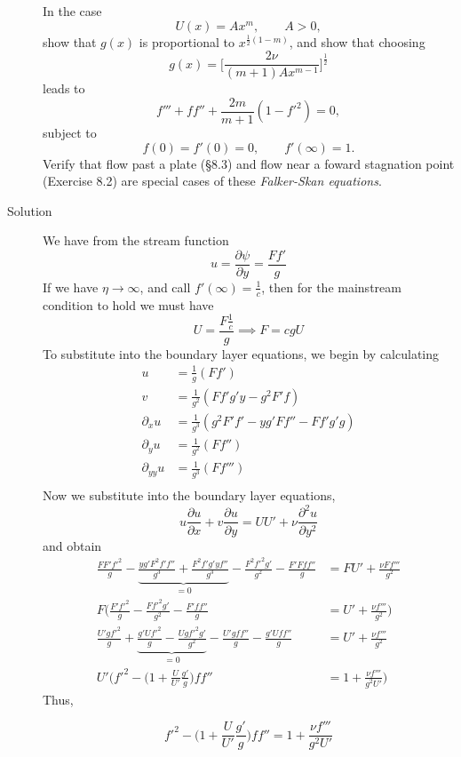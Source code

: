 \documentclass[11pt]{article}
\newcommand{\eq}[1]{\begin{align*}#1\end{align*}}
\newcommand{\eqn}[2]{
  \begin{equation}
    \label{#1}
    #2
  \end{equation}
}
\newcommand{\fp}[2]{\frac{\partial#1}{\partial#2}}
\newcommand{\fpp}[2]{\frac{\partial^2 #1}{\partial#2^2}}
\newcommand{\p}[1]{\partial_{#1}}
\begin{document}
\begin{description}
In the case
$$
  U(x) = Ax^m,
  \qquad
  A > 0,
$$
show that $g(x)$ is proportional to $x^{\frac{1}{2}(1-m)}$, and show that choosing
$$
  g(x)
  =
  \bigg[
  \frac{2\nu}{(m+1)Ax^{m-1}}
  \bigg]^{\frac{1}{2}}
$$
leads to
$$
  f''' + ff'' + \frac{2m}{m+1}(1-f'^2) = 0,
$$
subject to
$$
  f(0) = f'(0) = 0,
  \qquad
  f'(\infty) = 1.
$$
Verify that flow past a plate (\S 8.3) and flow near a foward stagnation point
(Exercise 8.2) are special cases of these \emph{Falker-Skan equations}.
\item[Solution]
We have from the stream function
$$
  u = \fp{\psi}{y} = \frac{F f'}{g}
$$
If we have $\eta \rightarrow \infty$, and call $f'(\infty) = \frac{1}{c}$, then
for the mainstream condition to hold we must have
$$
  U = \frac{F\frac{1}{c}}{g}
  \implies
  F = cgU
$$
To substitute into the boundary layer equations, we begin by calculating
\eq{
  u &= \frac{1}{g}\left( Ff' \right) \\
  v &= \frac{1}{g^2}\left(Ff'g'y - g^2F'f \right) \\
  \p{x}u &= \frac{1}{g^3}\left( g^2F'f' - yg'Ff'' - Ff'g'g \right) \\
  \p{y}u &= \frac{1}{g^2}\left( F f'' \right) \\
  \p{yy}u &= \frac{1}{g^3}\left( F f''' \right) \\
}
Now we substitute into the boundary layer equations,
$$
  u \fp{u}{x} + v\fp{u}{y} = UU' + \nu\fpp{u}{y}
$$
and obtain
\eq{
  \frac{FF'f'^2}{g}
  - \underbrace{
  \frac{yg'F^2f'f''}{g^3}
  + \frac{F^2f'g'yf''}{g^3}
  }_{=0}
  - \frac{F^2f'^2 g'}{g^2}
  - \frac{F'Fff''}{g}
  &=
  FU'
  + \frac{\nu Ff'''}{g^2}
  \\
%
%
  F\bigg(
  \frac{F'f'^2}{g}
  - \frac{Ff'^2 g'}{g^2}
  - \frac{F'ff''}{g}
  &=
  U'
  + \frac{\nu f'''}{g^2}
  \bigg)
  \\
%
%
  \frac{U'gf'^2}{g}
  + \underbrace{
  \frac{g'Uf'^2}{g}
  - \frac{Ugf'^2 g'}{g^2}
  }_{=0}
  - \frac{U'gff''}{g}
  - \frac{g'Uff''}{g}
  &=
  U'
  + \frac{\nu f'''}{g^2}
  \\
%
%
  U'\bigg(
  f'^2
  - \big(
  1
  + \frac{U}{U'}\frac{g'}{g}
  \big) ff''
  &=
  1
  + \frac{\nu f'''}{g^2U'}
  \bigg)
%
%
}
Thus,
\eqn{main_equation}{
  f'^2
  - \bigg(
  1
  + \frac{U}{U'}\frac{g'}{g}
  \bigg) ff''
  =
  1
  + \frac{\nu f'''}{g^2U'}
}


\end{description}
\end{document}
